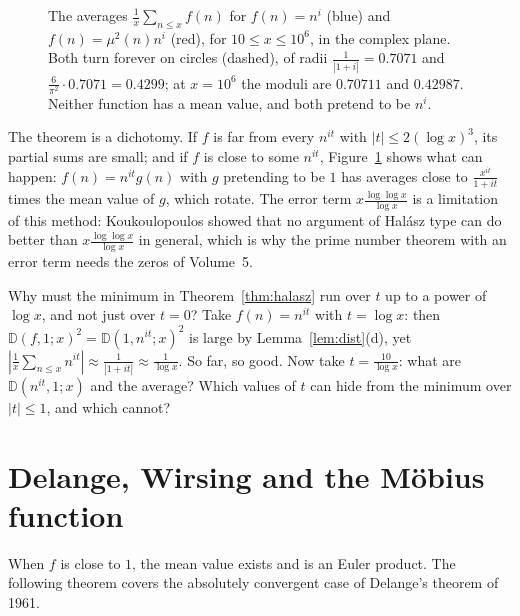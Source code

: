 \begin{figure}[ht]
\centering
{}
\caption{The averages $\frac1x\sum_{n\le x}f(n)$ for $f(n)=n^{i}$ (blue) and $f(n)=\mu^2(n)n^{i}$ (red), for $10\le x\le10^6$, in the complex plane. Both turn forever on circles (dashed), of radii $\frac1{|1+i|}=0.7071$ and $\frac6{\pi^2}\cdot0.7071=0.4299$; at $x=10^6$ the moduli are $0.70711$ and $0.42987$. Neither function has a mean value, and both pretend to be $n^{i}$.}
\label{fig:spiral}
\end{figure}

The theorem is a dichotomy. If $f$ is far from every $n^{it}$ with $|t|\le2(\log x)^3$, its partial sums are small; and if $f$ is close to some $n^{it}$, Figure~\ref{fig:spiral} shows what can happen: $f(n)=n^{it}g(n)$ with $g$ pretending to be $1$ has averages close to $\frac{x^{it}}{1+it}$ times the mean value of $g$, which rotate. The error term $x\frac{\log\log x}{\log x}$ is a limitation of this method: Koukoulopoulos showed that no argument of Halász type can do better than $x\frac{\log\log x}{\log x}$ in general, which is why the prime number theorem with an error term needs the zeros of Volume~5.

\begin{think}
Why must the minimum in Theorem~\ref{thm:halasz} run over $t$ up to a power of $\log x$, and not just over $t=0$? Take $f(n)=n^{it}$ with $t=\log x$: then $\mathbb D(f,1;x)^2=\mathbb D(1,n^{it};x)^2$ is large by Lemma~\ref{lem:dist}(d), yet $|\frac1x\sum_{n\le x}n^{it}|\approx\frac1{|1+it|}\approx\frac1{\log x}$. So far, so good. Now take $t=\frac{10}{\log x}$: what are $\mathbb D(n^{it},1;x)$ and the average? Which values of $t$ can hide from the minimum over $|t|\le1$, and which cannot?
\end{think}

\section{Delange, Wirsing and the Möbius function}

When $f$ is close to $1$, the mean value exists and is an Euler product. The following theorem covers the absolutely convergent case of Delange's theorem of 1961.

